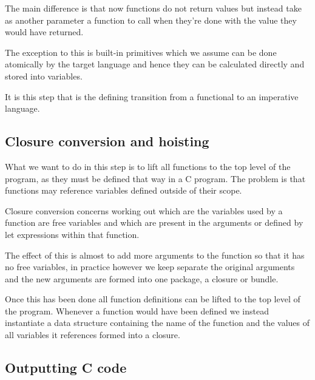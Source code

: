 \documentclass[a4paper]{article}
\begin{document}
The main difference is that now functions do not return values but instead take as another parameter a function to call when they're done with the value they would have returned.

The exception to this is built-in primitives which we assume can be done atomically by the target language and hence they can be calculated directly and stored into variables.

It is this step that is the defining transition from a functional to an imperative language.




\subsection{Closure conversion and hoisting}

What we want to do in this step is to lift all functions to the top level of the program, as they must be defined that way in a C program. The problem is that functions may reference variables defined outside of their scope.

Closure conversion concerns working out which are the variables used by a function are free variables and which are present in the arguments or defined by let expressions within that function.

The effect of this is almost to add more arguments to the function so that it has no free variables, in practice however we keep separate the original arguments and the new arguments are formed into one package, a closure or bundle.

Once this has been done all function definitions can be lifted to the top level of the program. Whenever a function would have been defined we instead instantiate a data structure containing the name of the function and the values of all variables it references formed into a closure.




\subsection{Outputting C code}
\end{document}
